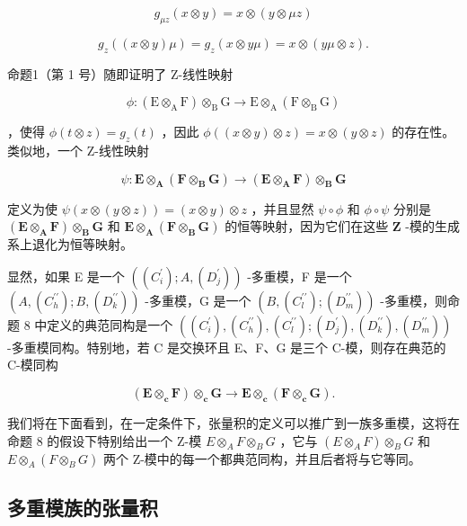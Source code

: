 \[
g _ {\mu z} (x \otimes y) = x \otimes (y \otimes \mu z)
\]

\[
g _ {z} ((x \otimes y) \mu) = g _ {z} (x \otimes y \mu) = x \otimes (y \mu \otimes z).
\]

命题1（第 1 号）随即证明了 Z-线性映射

\[
\phi : (\mathrm{E} \otimes_ {\mathrm{A}} \mathrm{F}) \otimes_ {\mathrm{B}} \mathrm{G} \rightarrow \mathrm{E} \otimes_ {\mathrm{A}} (\mathrm{F} \otimes_ {\mathrm{B}} \mathrm{G})
\]

，使得 \(\phi(t \otimes z) = g_z(t)\) ，因此 \(\phi((x \otimes y) \otimes z) = x \otimes (y \otimes z)\) 的存在性。类似地，一个 Z-线性映射

\[
\psi : \mathbf {E} \otimes_ {\mathbf {A}} (\mathbf {F} \otimes_ {\mathbf {B}} \mathbf {G}) \rightarrow (\mathbf {E} \otimes_ {\mathbf {A}} \mathbf {F}) \otimes_ {\mathbf {B}} \mathbf {G}
\]

定义为使 \(\psi(x \otimes (y \otimes z)) = (x \otimes y) \otimes z\) ，并且显然 \(\psi \circ \phi\) 和 \(\phi \circ \psi\) 分别是 \((\mathbf{E} \otimes_{\mathbf{A}} \mathbf{F}) \otimes_{\mathbf{B}} \mathbf{G}\) 和 \(\mathbf{E} \otimes_{\mathbf{A}} (\mathbf{F} \otimes_{\mathbf{B}} \mathbf{G})\) 的恒等映射，因为它们在这些 \(\mathbf{Z}\) -模的生成系上退化为恒等映射。

显然，如果 E 是一个 \(((C_{i}^{\prime}); A, (D_{j}^{\prime}))\) -多重模，F 是一个 \((A, (C_{h}^{\prime\prime}); B, (D_{k}^{\prime\prime}))\) -多重模，G 是一个 \((B, (C_{l}^{\prime\prime}); (D_{m}^{\prime\prime}))\) -多重模，则命题 8 中定义的典范同构是一个 \(((C_{i}^{\prime}), (C_{h}^{\prime\prime}), (C_{l}^{\prime\prime}); (D_{j}^{\prime}), (D_{k}^{\prime\prime}), (D_{m}^{\prime\prime}))\) -多重模同构。特别地，若 C 是交换环且 E、F、G 是三个 C-模，则存在典范的 C-模同构

\[
(\mathbf {E} \otimes_ {\mathbf {c}} \mathbf {F}) \otimes_ {\mathbf {c}} \mathbf {G} \rightarrow \mathbf {E} \otimes_ {\mathbf {c}} (\mathbf {F} \otimes_ {\mathbf {c}} \mathbf {G}).
\]

我们将在下面看到，在一定条件下，张量积的定义可以推广到一族多重模，这将在命题 8 的假设下特别给出一个 Z-模 \(E \otimes_{A} F \otimes_{B} G\) ，它与 \((E \otimes_{A} F) \otimes_{B} G\) 和 \(E \otimes_{A} (F \otimes_{B} G)\) 两个 Z-模中的每一个都典范同构，并且后者将与它等同。

\subsection{多重模族的张量积}

